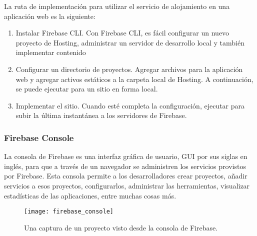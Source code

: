 La ruta de implementación para utilizar el servicio de alojamiento 
en una aplicación web es la siguiente:

\begin{enumerate}
\item {} 
Instalar Firebase CLI. Con Firebase CLI, es fácil configurar un nuevo proyecto de Hosting, administrar un servidor de desarrollo local y también implementar contenido

\item {} 
Configurar un directorio de proyectos. Agregar archivos para la aplicación web y agregar activos estáticos a la carpeta local de Hosting. A continuación, se puede ejecutar  para un sitio en forma local.

\item {} 
Implementar el sitio. Cuando esté
completa la configuración, ejecutar  para subir la última instantánea a los servidores de Firebase.

\end{enumerate}


\subsubsection{Firebase Console}

La consola de Firebase es una interfaz gráfica de usuario, GUI por sus 
siglas en inglés, para que a través de un navegador se administren
los servicios provistos por Firebase. Esta consola permite a los desarrolladores
crear proyectos, añadir servicios a esos proyectos,
configurarlos, administrar las herramientas, visualizar estadísticas
de las aplicaciones, entre muchas cosas más.

\begin{figure}[ht]
\centering
\caption{Una captura de un proyecto visto desde la consola
de Firebase.}
\texttt{[image: firebase\_console]}
\end{figure}
